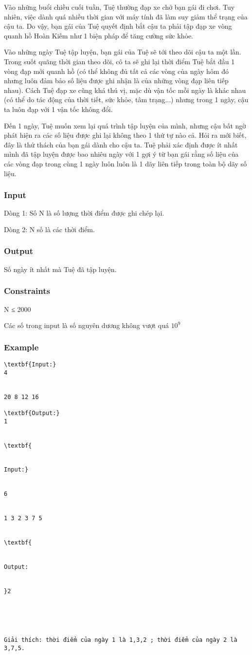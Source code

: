 



   Vào những buổi chiều cuối tuần, Tuệ thường đạp xe chở bạn gái đi chơi. Tuy nhiên, việc dành quá nhiều thời gian với máy tính đã làm suy giảm thể trạng của cậu ta. Do vậy, bạn gái của Tuệ quyết định bắt cậu ta phải tập đạp xe vòng quanh hồ Hoàn Kiếm như 1 biện pháp để tăng cường sức khỏe.   





   Vào những ngày Tuệ tập luyện, bạn gái của Tuệ sẽ tới theo dõi cậu ta một lần. Trong suốt quãng thời gian theo dõi, cô ta sẽ ghi lại thời điểm Tuệ bắt đầu 1 vòng đạp mới quanh hồ (có thể không đủ tất cả các vòng của ngày hôm đó nhưng luôn đảm bảo số liệu được ghi nhận là của những vòng đạp liên tiếp nhau). Cách Tuệ đạp xe cũng khá thú vị, mặc dù vận tốc mỗi ngày là khác nhau (có thể do tác động của thời tiết, sức khỏe, tâm trạng...) nhưng trong 1 ngày, cậu ta luôn đạp với 1 vận tốc không đổi.   





   Đến 1 ngày, Tuệ muốn xem lại quá trình tập luyện của mình, nhưng cậu bất ngờ phát hiện ra các số liệu được ghi lại không theo 1 thứ tự nào cả. Hỏi ra mới biết, đây là thử thách của bạn gái dành cho cậu ta. Tuệ phải xác định được ít nhất mình đã tập luyện được bao nhiêu ngày với 1 gợi ý từ bạn gái rằng số liệu của các vòng đạp trong cùng 1 ngày luôn luôn là 1 dãy liên tiếp trong toàn bộ dãy số liệu.  

\subsubsection{   Input  }

   Dòng 1: Số N là số lượng thời điểm được ghi chép lại.   


   Dòng 2: N số là các thời điểm.  

\subsubsection{   Output  }

   Số ngày ít nhất mà Tuệ đã tập luyện.  

\subsubsection{   Constraints  }

   N ≤ 2000   


   Các số trong input là số nguyên dương không vượt quá $10^{9}$

\subsubsection{   Example  }
\begin{verbatim}
\textbf{Input:}
4


20 8 12 16

\textbf{Output:}
1


\textbf{


Input:}


6


1 3 2 3 7 5


\textbf{


Output:


}2





Giải thích: thời điểm của ngày 1 là 1,3,2 ; thời điểm của ngày 2 là 3,7,5.\end{verbatim}
